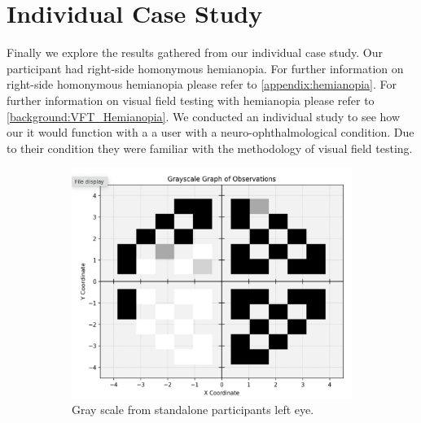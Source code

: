 \documentclass{l4proj}
\begin{document}
\section{Individual Case Study} \label{individual_study}
Finally we explore the results gathered from our individual case study. Our participant had right-side homonymous hemianopia. For further information on right-side homonymous hemianopia please refer to \ref{appendix:hemianopia}. For further information on visual field testing with hemianopia please refer to \ref{background:VFT_Hemianopia}. We conducted an individual study to see how our it would function with a a user with a neuro-ophthalmological condition. Due to their condition they were familiar with the methodology of visual field testing. 
\begin{figure}[htbp]
    \centering
    \begin{subfigure}[b]{0.49\textwidth}
        \includegraphics[width=\textwidth]{dissertation/images/standalone_left_gs.png}
        \caption{Gray scale from standalone participants left eye.}
        \label{fig:standalone_left_gs}
    \end{subfigure}
    ~
    \begin{subfigure}[b]{0.49\textwidth}

\end{subfigure}
\end{figure}
\end{document}
